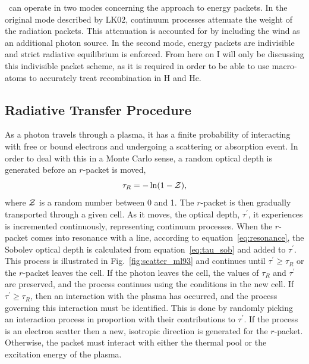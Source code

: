 \py\ can operate in two modes concerning the approach to energy packets. 
In the original mode described by LK02, continuum processes attenuate 
the weight of the radiation packets. This attenuation is accounted for 
by including the wind as an additional photon source.
In the second mode, energy packets are indivisible and strict radiative equilibrium is
enforced. From here on I will only be discussing this indivisible packet scheme, 
as it is required in order to be able to use macro-atoms to accurately
treat recombination in H and He.

\subsection{Radiative Transfer Procedure}

\label{sec:rt_procedure}

As a photon travels through a plasma, it has a finite probability
of interacting with free or bound electrons and undergoing a scattering
or absorption event. In order to deal with this in a Monte Carlo sense, a random optical 
depth is generated before an $r$-packet is moved,
\begin{equation}
\tau_R = - \ln (1 - {\cal Z}),
\end{equation}
where ${\cal Z}$ is a random number between 0 and 1. 
The $r$-packet is then gradually transported through a given cell. 
As it moves, the optical depth, $\tau^\prime$, it experiences
is incremented continuously, representing continuum processes. When the $r$-packet comes
into resonance with a line, according to equation~\ref{eq:resonance},
the Sobolev optical depth is calculated from equation~\ref{eq:tau_sob} and added to 
$\tau^\prime$. This process is illustrated in Fig.~\ref{fig:scatter_ml93} and
continues until $\tau^\prime \geq \tau_R$ or the $r$-packet leaves the cell. If the
photon leaves the cell, the values of $\tau_R$ and $\tau^\prime$ are preserved,
and the process continues using the conditions in the new cell. If 
$\tau^\prime \geq \tau_R$, then an interaction with the plasma has occurred, and
the process governing this interaction must be identified. This is done by
randomly picking an interaction process in proportion with their contributions
to $\tau^\prime$. If the process is an electron scatter then a new, isotropic
direction is generated for the $r$-packet. Otherwise, the packet must
interact with either the thermal pool or the excitation energy of the plasma.

